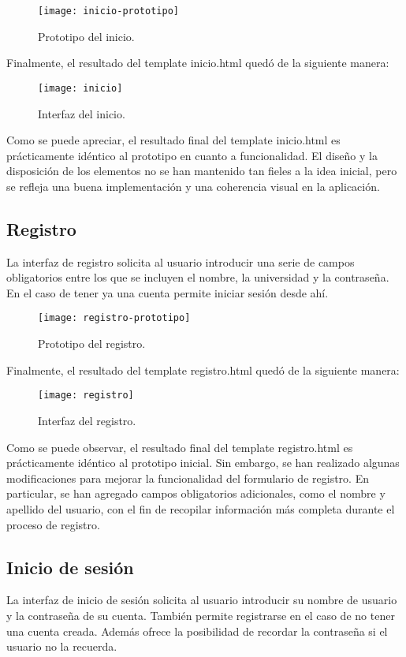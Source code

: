 \begin{figure}[htb]
\centering
\texttt{[image: inicio-prototipo]}
\caption{Prototipo del inicio.}
\label{fig:inicio-prototipo}
\end{figure}

Finalmente, el resultado del template inicio.html quedó de la siguiente manera:

\begin{figure}[htb]
\centering
\texttt{[image: inicio]}
\caption{Interfaz del inicio.}
\label{fig:inicio}
\end{figure}

Como se puede apreciar, el resultado final del template inicio.html es prácticamente idéntico al prototipo en cuanto a funcionalidad. El diseño y la disposición de los elementos no se han mantenido tan fieles a la idea inicial, pero se refleja una buena implementación y una coherencia visual en la aplicación.

\subsection{Registro}
La interfaz de registro solicita al usuario introducir una serie de campos obligatorios entre los que se incluyen el nombre, la universidad y la contraseña. En el caso de tener ya una cuenta permite iniciar sesión desde ahí.

\begin{figure}[htb]
\centering
\texttt{[image: registro-prototipo]}
\caption{Prototipo del registro.}
\label{fig:registro-prototipo}
\end{figure}

Finalmente, el resultado del template registro.html quedó de la siguiente manera:

\begin{figure}[htb]
\centering
\texttt{[image: registro]}
\caption{Interfaz del registro.}
\label{fig:registro}
\end{figure}

Como se puede observar, el resultado final del template registro.html es prácticamente idéntico al prototipo inicial. Sin embargo, se han realizado algunas modificaciones para mejorar la funcionalidad del formulario de registro. En particular, se han agregado campos obligatorios adicionales, como el nombre y apellido del usuario, con el fin de recopilar información más completa durante el proceso de registro.

\subsection{Inicio de sesión}
La interfaz de inicio de sesión solicita al usuario introducir su nombre de usuario y la contraseña de su cuenta. También permite registrarse en el caso de no tener una cuenta creada. Además ofrece la posibilidad de recordar la contraseña si el usuario no la recuerda.

